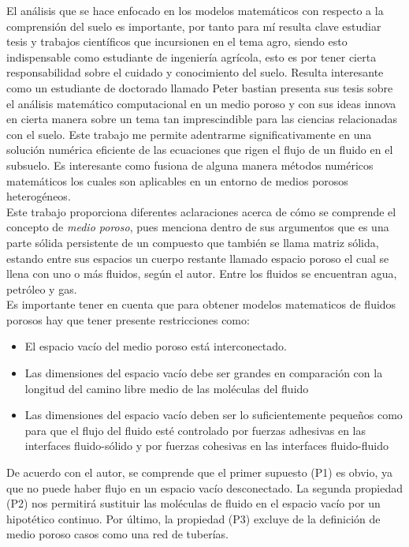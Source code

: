 
El análisis que se hace enfocado en los modelos matemáticos con respecto a la comprensión del suelo es importante, por tanto para mí resulta clave estudiar tesis y trabajos científicos que incursionen en el tema agro, siendo esto indispensable como estudiante de ingeniería agrícola, esto es por tener cierta responsabilidad sobre el cuidado y conocimiento del suelo. Resulta interesante como un estudiante de doctorado llamado Peter bastian presenta sus tesis sobre el análisis matemático computacional en un medio poroso \parencite{Spalding1981} y con sus ideas innova en cierta manera sobre un tema tan imprescindible para las ciencias relacionadas con el suelo. Este trabajo me permite adentrarme significativamente en una solución numérica eficiente de las ecuaciones que rigen el flujo de un fluido en el subsuelo. Es interesante como \parencite{Spalding1981} fusiona de alguna manera métodos numéricos matemáticos los cuales son aplicables en un entorno de medios porosos heterogéneos.\\

Este trabajo proporciona diferentes aclaraciones acerca de cómo se comprende el concepto de \textit{medio poroso}, pues menciona dentro de sus argumentos que es una parte sólida persistente de un compuesto que también se llama matriz sólida, estando entre sus espacios un cuerpo restante llamado espacio poroso el cual se llena con uno o más fluidos, según el autor. Entre los fluidos se encuentran agua, petróleo y gas.\\

Es importante tener en cuenta que para obtener modelos matematicos de fluidos porosos hay que tener presente restricciones como:

\begin{itemize}
	\item El espacio vacío del medio poroso está interconectado.
	\item Las dimensiones del espacio vacío debe ser grandes en comparación con la longitud del camino libre medio de las  moléculas del fluido 
	\item Las dimensiones del espacio vacío deben ser lo suficientemente pequeños como para que el flujo del fluido esté controlado por fuerzas adhesivas en las interfaces fluido-sólido y por fuerzas cohesivas en las interfaces fluido-fluido 
\end{itemize}

De acuerdo con el autor, se comprende que el primer supuesto (P1) es obvio, ya que no puede haber flujo en un espacio vacío desconectado. La segunda propiedad (P2) nos permitirá sustituir las moléculas de fluido en el espacio vacío por un hipotético continuo. Por último, la propiedad (P3) excluye de la definición de medio poroso casos como una red de tuberías.\\

